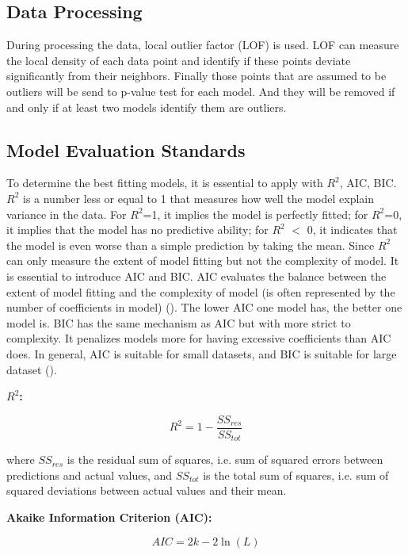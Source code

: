 \documentclass[11pt]{article}
\begin{document}
\subsection{Data Processing}
During processing the data, local outlier factor (LOF) is used. LOF can measure the local density of each data point and identify if these points deviate significantly from their neighbors. Finally those points that are assumed to be outliers will be send to p-value test for each model. And they will be removed if and only if at least two models identify them are outliers.

\subsection{Model Evaluation Standards}

To determine the best fitting models, it is essential to apply with $R^2$, AIC, BIC. $R^2$ is a number less or equal to 1 that measures how well the model explain variance in the data. For $R^2$=1, it implies the model is perfectly fitted; for $R^2$=0, it implies that the model has no predictive ability; for $R^2$ $<$ 0, it indicates that the model is even worse than a simple prediction by taking the mean. Since $R^2$ can only measure the extent of model fitting but not the complexity of model. It is essential to introduce AIC and BIC. AIC evaluates the balance between the extent of model fitting and the complexity of model (is often represented by the number of coefficients in model) (\cite{akaike1974aic}). The lower AIC one model has, the better one model is. BIC has the same mechanism as AIC but with more strict to complexity. It penalizes models more for having excessive coefficients than AIC does. In general, AIC is suitable for small datasets, and BIC is suitable for large dataset (\cite{burnham2002model}).

\textbf{$R^2$:}

\begin{equation}
R^2 = 1 - \frac{SS_{res}}{SS_{tot}}
\end{equation}

where $SS_{res}$ is the residual sum of squares, i.e. sum of squared errors between predictions and actual values, and $SS_{tot}$ is the total sum of squares, i.e. sum of squared deviations between actual values and their mean.

\textbf{Akaike Information Criterion (AIC):}

\begin{equation}
AIC = 2k - 2 \ln(L)
\end{equation}
\end{document}

